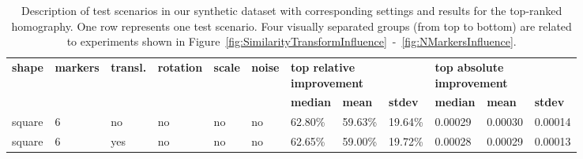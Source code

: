 \def\tblsccolw{0.06}
\def\tblrscolw{0.08}
\begin{table}[t]
    \caption{Description of test scenarios in our synthetic dataset with corresponding settings and results for the top-ranked homography. One row represents one test scenario. Four visually separated groups (from top to bottom) are related to experiments shown in Figure~\ref{fig:SimilarityTransformInfluence}~-~\ref{fig:NMarkersInfluence}.}
    \label{tab:TestScenariosResults}
    \setlength{\tabcolsep}{3pt}
    \begin{center}
        \footnotesize
        \begin{tabular}{p{\tblsccolw\linewidth}p{\tblsccolw\linewidth}p{\tblsccolw\linewidth}p{\tblsccolw\linewidth}p{\tblsccolw\linewidth}p{\tblsccolw\linewidth}|p{\tblrscolw\linewidth}p{\tblrscolw\linewidth}p{\tblrscolw\linewidth}p{\tblrscolw\linewidth}p{\tblrscolw\linewidth}p{\tblrscolw\linewidth}}
            \toprule
            \multirow{2}{2pt}{\textbf{shape}}    &
            \multirow{2}{2pt}{\textbf{markers}}  &
            \multirow{2}{2pt}{\textbf{transl.}}  &
            \multirow{2}{2pt}{\textbf{rotation}} &
            \multirow{2}{2pt}{\textbf{scale}}    &
            \multirow{2}{2pt}{\textbf{noise}}    & \multicolumn{3}{l}{\textbf{top relative improvement}} & \multicolumn{3}{l}{\textbf{top absolute improvement}}                                                                                                         \\
                                                 &                                                       &                                                       &     &     &     & \textbf{median} & \textbf{mean} & \textbf{stdev} &
            \textbf{median}                      & \textbf{mean}                                         & \textbf{stdev}                                                                                                                                                \\
            \midrule
            square                               & 6                                                     & no                                                    & no  & no  & no  & 62.80\%         & 59.63\%       & 19.64\%        & 0.00029  & 0.00030   & 0.00014   \\
            square                               & 6                                                     & yes                                                   & no  & no  & no  & 62.65\%         & 59.00\%       & 19.72\%        & 0.00028  & 0.00029   & 0.00013   \\

\end{tabular}
\end{center}
\end{table}
